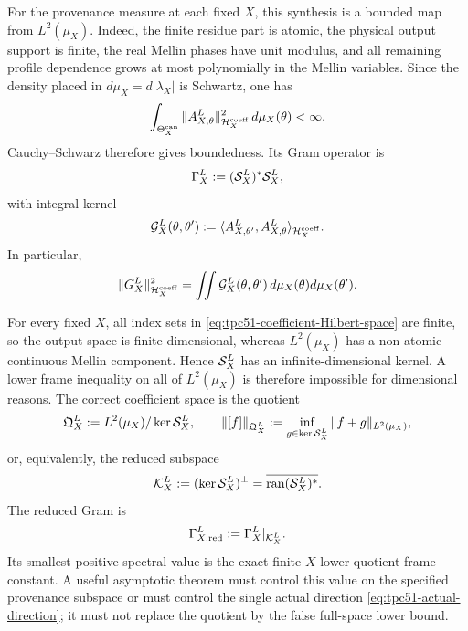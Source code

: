 For the provenance measure at each fixed \(X\), this synthesis is a
bounded map from \(L^2(\mu_X)\).  Indeed, the finite residue part is
atomic, the physical output support is finite, the real Mellin phases
have unit modulus, and all remaining profile dependence grows at most
polynomially in the Mellin variables.  Since the density placed in
\(d\mu_X=d|\lambda_X|\) is Schwartz, one has
\begin{equation}
 \int_{\Theta_X^{\rm can}}
 \|A_{X,\theta}^L\|_{\mathcal H_X^{\rm coeff}}^2\,d\mu_X(\theta)<\infty.
 \label{eq:tpc51-L2-synthesis-integrability}
\end{equation}
Cauchy--Schwarz therefore gives boundedness.  Its Gram operator is
\begin{equation}
 \Gamma_X^L:=(\mathcal S_X^L)^*\mathcal S_X^L,
 \label{eq:tpc51-Gram-operator}
\end{equation}
with integral kernel
\begin{equation}
 \mathcal G_X^L(\theta,\theta')
 :=\langle A_{X,\theta'}^L,A_{X,\theta}^L\rangle_{\mathcal H_X^{\rm coeff}}.
 \label{eq:tpc51-Gram-kernel}
\end{equation}
In particular,
\begin{equation}
 \|G_X^L\|_{\mathcal H_X^{\rm coeff}}^2
 =\iint
 \mathcal G_X^L(\theta,\theta')
 \,d\mu_X(\theta)d\mu_X(\theta').
 \label{eq:tpc51-actual-Gram-quadratic-form}
\end{equation}

For every fixed $X$, all index sets in
\eqref{eq:tpc51-coefficient-Hilbert-space} are finite, so the output space
is finite-dimensional, whereas
$L^2(\mu_X)$ has a non-atomic continuous Mellin component.  Hence
$\mathcal S_X^L$ has an infinite-dimensional kernel.  A lower frame inequality on
all of $L^2(\mu_X)$ is therefore impossible for dimensional reasons.  The
correct coefficient space is the quotient
\begin{equation}
 \mathfrak Q_X^L
 :=L^2(\mu_X)/\ker\mathcal S_X^L,
 \qquad
 \|[f]\|_{\mathfrak Q_X^L}
 :=\inf_{g\in\ker\mathcal S_X^L}\|f+g\|_{L^2(\mu_X)},
 \label{eq:tpc51-quotient-space}
\end{equation}
or, equivalently, the reduced subspace
\begin{equation}
 \mathcal K_X^L
 :=(\ker\mathcal S_X^L)^\perp
 =\overline{\operatorname{ran}(\mathcal S_X^L)^*}.
 \label{eq:tpc51-reduced-space}
\end{equation}
The reduced Gram is
\begin{equation}
 \Gamma_{X,\rm red}^L
 :=\Gamma_X^L|_{\mathcal K_X^L}.
 \label{eq:tpc51-reduced-Gram}
\end{equation}
Its smallest positive spectral value is the exact finite-$X$ lower quotient
frame constant.  A useful asymptotic theorem must control this value on the
specified provenance subspace or must control the single actual direction
\eqref{eq:tpc51-actual-direction}; it must not replace the quotient by the
false full-space lower bound.

